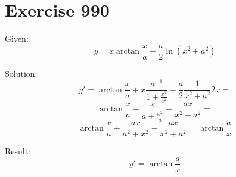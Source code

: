 \documentclass[a4paper, 10pt]{scrartcl}
\begin{document}
\section{Exercise 990}

Given:
\[
y = x\arctan{\frac{x}{a}} - \frac{a}{2}\ln{(x^{2} + a^{2})}
\]

Solution:
\[
y' = \arctan{\frac{x}{a}} + x\frac{a^{-1}}{1 + \frac{x^{2}}{a^{2}}} - \frac{a}{2}\frac{1}{x^{2} + a^{2}}2x =
\]
\[
\arctan{\frac{x}{a}} + \frac{x}{a + \frac{x^{2}}{a}} - \frac{ax}{x^{2} + a^{2}} =
\]
\[
\arctan{\frac{x}{a}} + \frac{ax}{a^{2} + x^{2}} - \frac{ax}{x^{2} + a^{2}} = \arctan{\frac{a}{x}}
\]

Result:
\[
y' = \arctan{\frac{a}{x}}
\]
\end{document}
